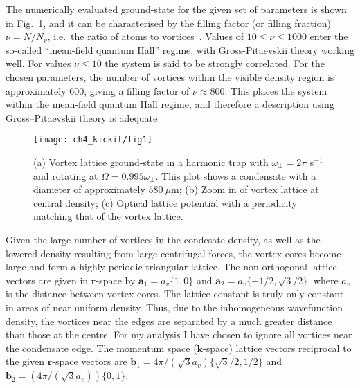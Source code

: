 The numerically evaluated ground-state for the given set of parameters is shown in Fig.~\ref{fig:vlatt_gnd}, and it can be characterised by the filling factor (or filling fraction) $\nu=N/N_v$, i.e.~the ratio of atoms to vortices~\cite{BEC:Fetter_revmodphys_2009}. Values of $10 \leq \nu \leq 1000$ enter the so-called ``mean-field quantum Hall'' regime, with Gross-Pitaevskii theory working well. For values $\nu \leq 10$ the system is said to be strongly correlated. For the chosen parameters, the number of vortices within the visible density region is approximately 600, giving a filling factor of $\nu \approx 800 $. This places the system within the mean-field quantum Hall regime, and therefore a description using Gross--Pitaevskii theory is adequate~\cite{Vtx:Schweikhard_prl_2004}

\begin{figure}[tb]
    \texttt{[image: ch4\_kickit/fig1]}
    \caption{(a) Vortex lattice ground-state in a harmonic trap with $\omega_\perp=2\pi$ s$^{-1}$ and rotating at $\Omega=0.995\omega_\perp$. This plot shows a condensate with a diameter of approximately $580~\mu\textrm{m}$; (b) Zoom in of vortex lattice at central density; (c) Optical lattice potential with a periodicity matching that of the vortex lattice.}
    \label{fig:vlatt_gnd}
\end{figure}

Given the large number of vortices in the condesate density, as well as the lowered density resulting from large centrifugal forces, the vortex cores become large and form a highly periodic triangular lattice. The non-orthogonal lattice vectors are given in $\mathbf{r}$-space by $\mathbf{a}_1 = a_v\{1,0\}$ and $\mathbf{a}_2 = a_v\{-1/2, \sqrt{3}/2\}$, where $a_v$ is the distance between vortex cores. The lattice constant is truly only constant in areas of near uniform density. Thus, due to the inhomogeneous wavefunction density, the vortices near the edges are separated by a much greater distance than those at the centre. For my analysis I have chosen to ignore all vortices near the condensate edge. The momentum space ($\mathbf{k}$-space) lattice vectors reciprocal to the given $\mathbf{r}$-space vectors are $\mathbf{b}_1 = 4\pi/(\sqrt{3}a_v)\{\sqrt{3}/2,1/2\}$ and $\mathbf{b}_2 = (4\pi/(\sqrt{3}a_v))\{0,1\}$.

